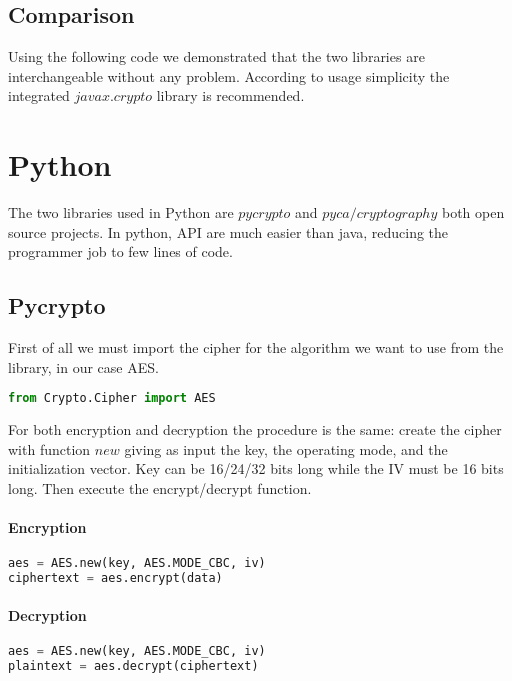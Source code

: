 \documentclass[11pt,a4paper]{article}
\begin{document}
\subsection{Comparison}
Using the following code we demonstrated that the two libraries are interchangeable without any problem. According to usage simplicity the integrated $javax.crypto$ library is recommended.

\clearpage

\section{Python}
The two libraries used in Python are $pycrypto$ and $pyca/cryptography$ both open source projects. In python, API are much easier than java, reducing the programmer job to few lines of code.
\subsection{Pycrypto}
First of all we must import the cipher for the algorithm we want to use from the library, in our case AES.
\begin{lstlisting}[language=Python,backgroundcolor = \color{lightgray}]
from Crypto.Cipher import AES
\end{lstlisting} For both encryption and decryption the procedure is the same: create the cipher with function $new$ giving as input the key, the operating mode, and the initialization vector. Key can be 16/24/32 bits long while the IV must be 16 bits long. Then execute the encrypt/decrypt function.

\paragraph{Encryption}
\begin{lstlisting}[language=Python,backgroundcolor = \color{lightgray}]
aes = AES.new(key, AES.MODE_CBC, iv)
ciphertext = aes.encrypt(data)
\end{lstlisting}
\paragraph{Decryption}
\begin{lstlisting}[language=Python,backgroundcolor = \color{lightgray}]
aes = AES.new(key, AES.MODE_CBC, iv)
plaintext = aes.decrypt(ciphertext)
\end{lstlisting}
\end{document}
